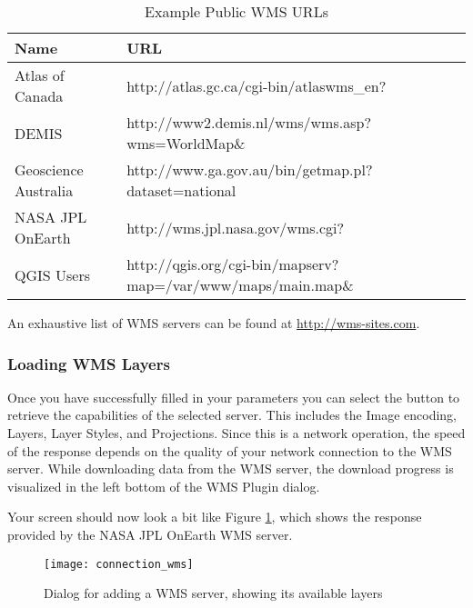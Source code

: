 \begin{table}[ht]
\centering
\caption{Example Public WMS URLs}\label{tab:wms_example_urls}\medskip
 \begin{tabular}{|l|l|}
\hline \textbf{Name}        & \textbf{URL} \\
\hline Atlas of Canada      & http://atlas.gc.ca/cgi-bin/atlaswms\_en? \\
\hline DEMIS                & http://www2.demis.nl/wms/wms.asp?wms=WorldMap\& \\
\hline Geoscience Australia & http://www.ga.gov.au/bin/getmap.pl?dataset=national \\
\hline NASA JPL OnEarth     & http://wms.jpl.nasa.gov/wms.cgi? \\
\hline QGIS Users           & http://qgis.org/cgi-bin/mapserv?map=/var/www/maps/main.map\& \\
\hline
\end{tabular}
\end{table}

An exhaustive list of WMS servers can be found at \url{http://wms-sites.com}.

\subsubsection{Loading WMS Layers}\label{sec:ogc-wms-layers}

Once you have successfully filled in your parameters you can select the
button to retrieve the capabilities of the selected server.  This includes the Image encoding,
Layers, Layer Styles, and Projections.  Since this
is a network operation, the speed of the response depends on the quality of your network
connection to the WMS server. While downloading data from the WMS server, the download progress 
is visualized in the left bottom of the WMS Plugin dialog. 

Your screen should now look a bit like Figure \ref{fig:connection_wms}, which shows the 
response provided by the NASA JPL OnEarth WMS server.

\begin{figure}[ht]
  \begin{center}
  	\caption{Dialog for adding a WMS server, showing its available layers}\label{fig:connection_wms}
	\texttt{[image: connection\_wms]}
  \end{center}
\end{figure}

